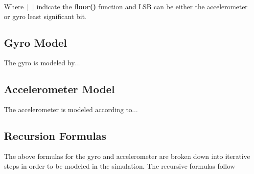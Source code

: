 \documentclass[]{BasiliskReportMemo}
\begin{document}
Where $\lfloor$  $\rfloor$ indicate the \textbf{floor()} function and LSB can be either the accelerometer or gyro least significant bit.
\subsection{Gyro Model}
The gyro is modeled by...
\subsection{Accelerometer Model}
The accelerometer is modeled according to...
\subsection{Recursion Formulas}
The above formulas for the gyro and accelerometer are broken down into iterative steps in order to be modeled in the simulation. The recursive formulas follow
\end{document}
